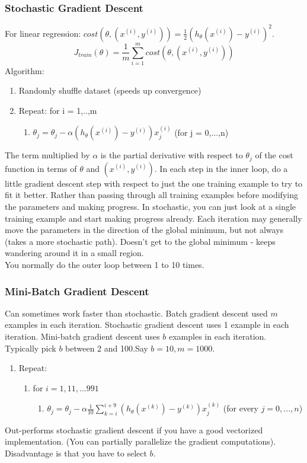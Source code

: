 \documentclass[11pt,letterpaper]{article}
\begin{document}
\subsubsection{Stochastic Gradient Descent}
For linear regression: $cost(\theta, (x^{(i)}, y^{(i)})) = \frac{1}{2}(h_\theta(x^{(i)}) - y^{(i)})^2.$
$$ J_{train}(\theta) = \frac{1}{m}\sum_{i=1}^{m}cost(\theta, (x^{(i)}, y^{(i)}))$$
Algorithm:
\begin{enumerate}
	\item Randomly shuffle dataset (speeds up convergence)
	\item Repeat: for i = 1,..,m
	\begin{enumerate}
		\item $\theta_j = \theta_j - \alpha (h_\theta(x^{(i)}) - y^{(i)})  x_j^{(i)}$ (for j = 0,...,n)
	\end{enumerate}
\end{enumerate}
The term multiplied by $\alpha$ is the partial derivative with respect to $\theta_j$ of the cost function in terms of $\theta$ and $(x^{(i)}, y^{(i)})$.
In each step in the inner loop, do a little gradient descent step with respect to just the one training example to try to fit it better.
Rather than passing through all training examples before modifying the parameters and making progress. In stochastic, you can just look at a single training example and start making progress already. Each iteration may generally move the parameters in the direction of the global minimum, but not always (takes a more stochastic path). Doesn't get to the global minimum - keeps wandering around it in a small region.\\
You normally do the outer loop between 1 to 10 times.

\subsubsection{Mini-Batch Gradient Descent}
Can sometimes work faster than stochastic. Batch gradient descent used $m$ examples in each iteration. Stochastic gradient descent uses 1 example in each iteration. Mini-batch gradient descent uses $b$ examples in each iteration. \\
Typically pick $b$ between 2 and 100.Say $b = 10, m = 1000$.
\begin{enumerate}
	\item Repeat:
	\begin{enumerate}
		\item for $i = 1, 11, ... 991 $
		\begin{enumerate}
			\item $\theta_j = \theta_j - \alpha \frac{1}{10}\sum_{k=i}^{i+9}(h_\theta(x^{(k)}) - y^{(k)})x^{(k)}_j$ (for every $j = 0,...,n$)
		\end{enumerate}
	\end{enumerate}
\end{enumerate}
Out-performs stochastic gradient descent if you have a good vectorized implementation. (You can partially parallelize the gradient computations). Disadvantage is that you have to select $b$.
\end{document}
